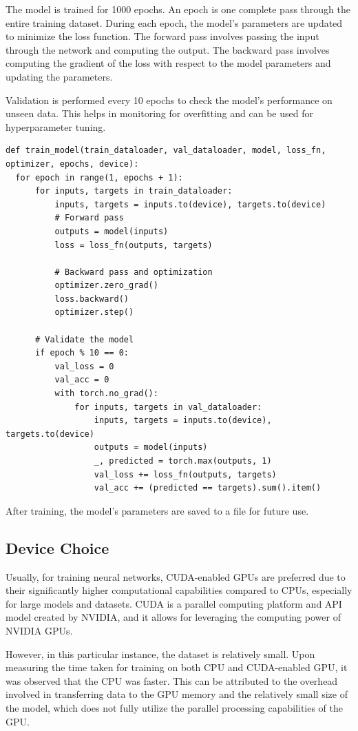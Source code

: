 The model is trained for 1000 epochs. An epoch is one complete pass through the entire training dataset. During each epoch, the model's parameters are updated to minimize the loss function. The forward pass involves passing the input through the network and computing the output. The backward pass involves computing the gradient of the loss with respect to the model parameters and updating the parameters.

Validation is performed every 10 epochs to check the model's performance on unseen data. This helps in monitoring for overfitting and can be used for hyperparameter tuning.

\begin{verbatim}
def train_model(train_dataloader, val_dataloader, model, loss_fn,
optimizer, epochs, device):
  for epoch in range(1, epochs + 1):
      for inputs, targets in train_dataloader:
          inputs, targets = inputs.to(device), targets.to(device)
          # Forward pass
          outputs = model(inputs)
          loss = loss_fn(outputs, targets)

          # Backward pass and optimization
          optimizer.zero_grad()
          loss.backward()
          optimizer.step()

      # Validate the model
      if epoch % 10 == 0:
          val_loss = 0
          val_acc = 0
          with torch.no_grad():
              for inputs, targets in val_dataloader:
                  inputs, targets = inputs.to(device), targets.to(device)
                  outputs = model(inputs)
                  _, predicted = torch.max(outputs, 1)
                  val_loss += loss_fn(outputs, targets)
                  val_acc += (predicted == targets).sum().item()
\end{verbatim}

After training, the model's parameters are saved to a file for future use.

\subsection*{Device Choice}

Usually, for training neural networks, CUDA-enabled GPUs are preferred due to their significantly higher computational capabilities compared to CPUs, especially for large models and datasets. CUDA is a parallel computing platform and API model created by NVIDIA, and it allows for leveraging the computing power of NVIDIA GPUs.

However, in this particular instance, the dataset is relatively small. Upon measuring the time taken for training on both CPU and CUDA-enabled GPU, it was observed that the CPU was faster. This can be attributed to the overhead involved in transferring data to the GPU memory and the relatively small size of the model, which does not fully utilize the parallel processing capabilities of the GPU.

